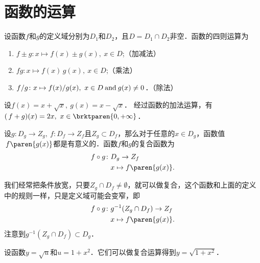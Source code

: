 \section{函数的运算\label{sec:funcops}}

\begin{definition}
  \label{defn:func4ops}
  设函数\(f\)和\(g\)的定义域分别为\(D_1\)和\(D_2\)，且\(D = D_1 \cap D_2\)非空．函数的四则运算为
  \begin{enumerate}
    \renewcommand{\labelenumi}{\enumparen{\arabic{enumi}}}
  \item \(f \pm g\colon x \mapsto f(x) \pm g(x),\ x \in D\);\hfill（加减法）
  \item \(fg\colon x \mapsto f(x) \, g(x),\ x \in D\);\hfill（乘法）
  \item \(f/g\colon x \mapsto f(x) / g(x),\ x \in D \mathbin{\text{and}} g(x) \ne 0\)．\hfill（除法）
  \end{enumerate}
\end{definition}

\begin{example*}
  设\(f(x) = x + \sqrt x,\ g(x) = x - \sqrt x\)．
  经过函数的加法运算，有\((\,f+g)(x) = 2x,\ x \in \brktparen{0, +\infty}\)．
\end{example*}

\begin{definition*}
  设\(g\colon D_g \to Z_g,\ f\colon D_f \to Z_f\)且\(Z_g \subset D_f\)，那么对于任意的\(x \in D_g\)，函数值\(\,f\paren{g(x)}\)都是有意义的．函数\(f\)和\(g\)的复合函数为
  \[
    \begin{split}
      f \circ g\colon & D_g \to Z_f \\
      & x \mapsto f\paren{g(x)}.
    \end{split}
  \]

  \begin{remark}
    我们经常把条件放宽，只要\(Z_g \cap D_f \ne \emptyset\)，就可以做复合，这个函数和上面的定义中的规则一样，只是定义域可能会变窄，即
    \[
      \begin{split}
        f \circ g\colon & g^{-1}(Z_g \cap D_f) \to Z_f \\
        & x \mapsto f\paren{g(x)}.
      \end{split}
    \]
    注意到\(g^{-1}(Z_g \cap D_f) \subset D_g\)．
  \end{remark}
\end{definition*}

\begin{example*}
  设函数\(y = \sqrt u\)和\(u = 1+x^2\)．它们可以做复合运算得到\(y = \sqrt{1+x^2}\)．
\end{example*}

